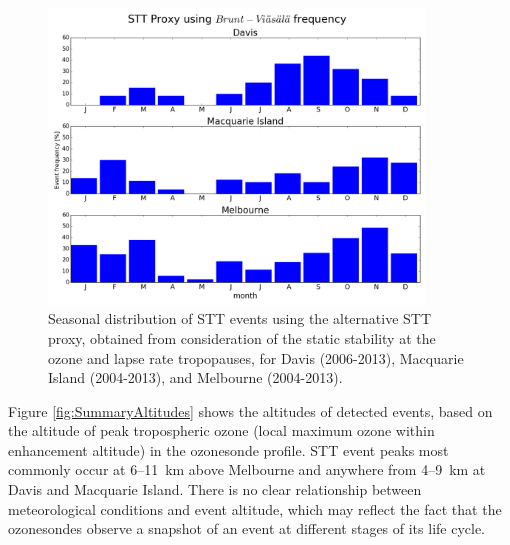 \documentclass[acp, manuscript]{copernicus} %
\begin{document}
  \begin{figure}[t]
    \includegraphics[width=10cm]{figures/AndrewProxySTTV2.png}
    \caption{Seasonal distribution of STT events using the alternative STT proxy, obtained from consideration of the static stability at the ozone and lapse rate tropopauses, for Davis (2006-2013), Macquarie Island (2004-2013), and Melbourne (2004-2013).}
    \label{fig:AndrewProxySTT}
  \end{figure}

  Figure \ref{fig:SummaryAltitudes} shows the altitudes of detected events, based on the altitude of peak tropospheric ozone (local maximum ozone within enhancement altitude) in the ozonesonde profile.
  STT event peaks most commonly occur at 6--11~km above Melbourne and anywhere from 4--9~km at Davis and Macquarie Island.
  There is no clear relationship between meteorological conditions and event altitude, which may reflect the fact that the ozonesondes observe a snapshot of an event at different stages of its life cycle.
\end{document}
